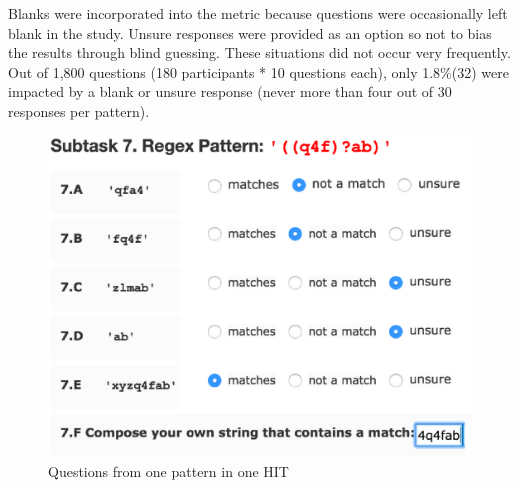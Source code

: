 Blanks were incorporated into the metric because questions were occasionally left blank in the study. Unsure responses were provided as an option so not to bias the results through blind guessing. These situations did not occur very frequently.
Out of 1,800 questions (180 participants * 10 questions each), only 1.8\%(32) were impacted by a blank or unsure response (never more than four out of 30 responses per pattern).


\begin{figure}[tb]
\centering
\includegraphics[width=0.75\columnwidth]{illustrations/exampleQuestion.eps}
\vspace{-12pt}
\caption{Questions from one pattern in one HIT}
\vspace{-6pt}
\label{fig:exampleQuestion}
\end{figure}



